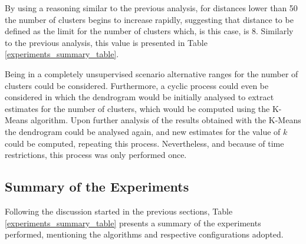 \documentclass[9pt,journal,compsoc]{IEEEtran}
\begin{document}
By using a reasoning similar to the previous analysis, for distances lower than 50 the number of clusters begins to increase rapidly, suggesting that distance to be defined as the limit for the number of clusters which, is this case, is 8. Similarly to the previous analysis, this value is presented in Table \ref{experiments_summary_table}.

Being in a completely unsupervised scenario alternative ranges for the number of clusters could be considered. Furthermore, a cyclic process could even be considered in which the dendrogram would be initially analysed to extract estimates for  the number of clusters, which would be computed using the K-Means algorithm. Upon further analysis of the results obtained with the K-Means the dendrogram could be analysed again, and new estimates for the value of $k$ could be computed, repeating this process. Nevertheless, and because of time restrictions, this process was only performed once.

\subsection{Summary of the Experiments}
\label{experiments_summary}

Following the discussion started in the previous sections, Table \ref{experiments_summary_table} presents a summary of the experiments performed, mentioning the algorithms and respective configurations adopted.
\end{document}
